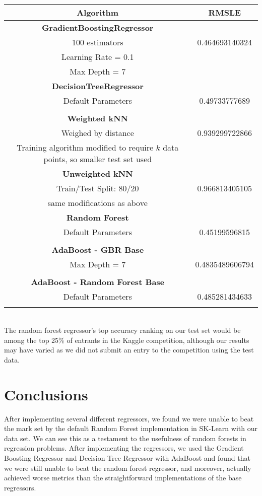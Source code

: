 \documentclass[11pt]{article}
\begin{document}
\\
\begin{table}[H]
\centering
\begin{tabular}{|c|c|}
\hline
Algorithm & RMSLE \\ \hline
\textbf{GradientBoostingRegressor} & \\ 100 estimators & 0.464693140324 \\ Learning Rate = 0.1 & \\Max Depth = 7 & \\ \hline
\textbf{DecisionTreeRegressor} & \\ Default Parameters  & 0.49733777689 \\ & \\ \hline
\textbf{Weighted kNN}&\\ Weighed by distance &  0.939299722866 \\ Training algorithm modified to require $k$ data points, so smaller test set used & \\ \hline
\textbf{Unweighted kNN} & \\ Train/Test Split: 80/20 & 0.966813405105 \\ same modifications as above & \\ \hline
\textbf{Random Forest } & \\ Default Parameters & 0.45199596815 \\ & \\ \hline
\textbf{AdaBoost - GBR Base} & \\ Max Depth = 7 & 0.4835489606794\\ & \\  \hline
\textbf{AdaBoost - Random Forest Base} & \\ Default Parameters & 0.485281434633 \\ & \\ \hline
\end{tabular}
\label{table:results}
\end{table}
\\
The random forest regressor's top accuracy ranking on our test set would be among the top 25\% of entrants in the Kaggle competition, although our results may have varied as we did not submit an entry to the competition using the test data. \\

\section{Conclusions}

After implementing several different regressors, we found we were unable to beat the mark set by the default Random Forest implementation in SK-Learn with our data set. We can see this as a testament to the usefulness of random forests in regression problems. After implementing the regressors, we used the Gradient Boosting Regressor and Decision Tree Regressor with AdaBoost and found that we were still unable to beat the random forest regressor, and moreover, actually achieved worse metrics than the straightforward implementations of the base regressors.
\end{document}
